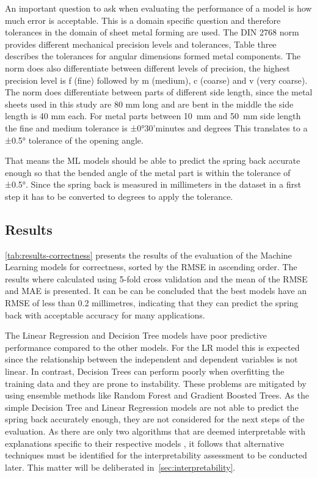 An important question to ask when evaluating the performance of a model is how much error is acceptable.
This is a domain specific question and therefore tolerances in the domain of sheet metal forming are used.
The DIN 2768 norm provides different mechanical precision levels and tolerances, Table three describes the tolerances
for angular dimensions formed metal components.
The norm does also differentiate between different levels of precision, the highest precision level is f (fine)
followed by m (medium), c (coarse) and v (very coarse).
The norm does differentiate between parts of different side length, since the metal sheets used in this study are 80
mm long and are bent in the middle the side length is 40 mm each.
For metal parts between 10~mm and 50~mm side length the fine and medium tolerance is ±0°30'minutes and degrees
This translates to a ±0.5° tolerance of the opening angle.

That means the \ac{ML} models should be able to predict the spring back accurate enough so that the bended angle of
the metal part is within the tolerance of ±0.5°.
Since the spring back is measured in millimeters in the dataset in a first step it has to be converted to degrees to
apply the tolerance.

\subsection{Results}\label{subsec:results}
\cref{tab:results-correctness} presents the results of the evaluation of the Machine Learning models for
correctness, sorted by the RMSE in ascending order.
The results where calculated using 5-fold cross validation and the mean of the RMSE and MAE is presented.
It can be can be concluded that the best models have an RMSE of less than 0.2 millimetres, indicating that they can
predict the spring back with acceptable accuracy for many applications.

The Linear Regression and Decision Tree models have poor predictive performance compared to the other models.
For the \ac{LR} model this is expected since the relationship between the independent and dependent variables is
not linear.
In contrast, Decision Trees can perform poorly when overfitting the training data and they are prone to
instability.
These problems are mitigated by using ensemble methods like Random Forest and Gradient Boosted Trees.
As the simple Decision Tree and Linear Regression models are not able to predict the spring back accurately enough,
they are not considered for the next steps of the evaluation.
As there are only two algorithms that are deemed interpretable with explanations specific to their respective models
, it follows that alternative techniques must be identified for the interpretability assessment to be conducted later.
This matter will be deliberated in~\cref{sec:interpretability}.

